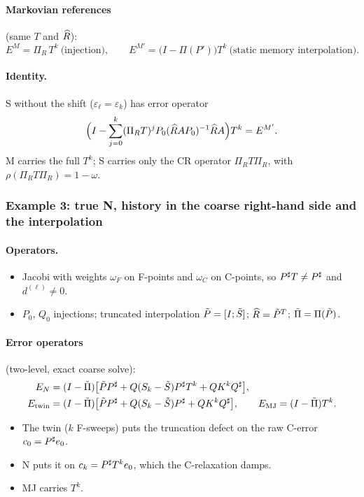 \paragraph{Markovian references} (same $T$ and $\widehat R$):
\[
  E^M=\Pi_R\,T^k\ \text{(injection)},\qquad E^{M'}=\bigl(I-\Pi(P')\bigr)T^k\ \text{(static memory interpolation)}.
\]

\paragraph{Identity.} S without the shift ($\varepsilon_\ell=\varepsilon_k$) has error operator
\[
  \Bigl(I-\sum_{j=0}^{k}(\Pi_RT)^jP_0(\widehat R AP_0)^{-1}\widehat R A\Bigr)T^k=E^{M'} .
\]
M carries the full $T^k$; S carries only the CR operator $\Pi_RT\Pi_R$, with $\rho(\Pi_RT\Pi_R)=1-\omega$.

\subsubsection{Example 3: true N, history in the coarse right-hand side and the interpolation}\label{sec:form-trueN}

\paragraph{Operators.}
\begin{itemize}
  \item Jacobi with weights $\omega_F$ on F-points and $\omega_C$ on C-points, so $P^{\sharp} T\neq P^{\sharp}$ and
    $d^{(\ell)}\neq0$.
  \item $P_0$, $Q_0$ injections; truncated interpolation $\tilde P=[I;\tilde S]$; $\widehat R=\tilde P^T$; $\tilde\Pi=\Pi(\tilde P)$.
\end{itemize}

\paragraph{Error operators} (two-level, exact coarse solve):
\begin{align}
  E_N&=(I-\tilde\Pi)\bigl[\tilde PP^{\sharp}+Q(S_k-\tilde S)P^{\sharp} T^k+QK^kQ^{\sharp}\bigr],\label{eq:EN}\\
  E_{\mathrm{twin}}&=(I-\tilde\Pi)\bigl[\tilde PP^{\sharp}+Q(S_k-\tilde S)P^{\sharp}+QK^kQ^{\sharp}\bigr],\qquad
  E_{\mathrm{MJ}}=(I-\tilde\Pi)T^k .\label{eq:Etwin}
\end{align}
\begin{itemize}
  \item The twin ($k$ F-sweeps) puts the truncation defect on the raw C-error $c_0=P^{\sharp} e_0$.
  \item N puts it on $c_k=P^{\sharp} T^ke_0$, which the C-relaxation damps.
  \item MJ carries $T^k$.
\end{itemize}

